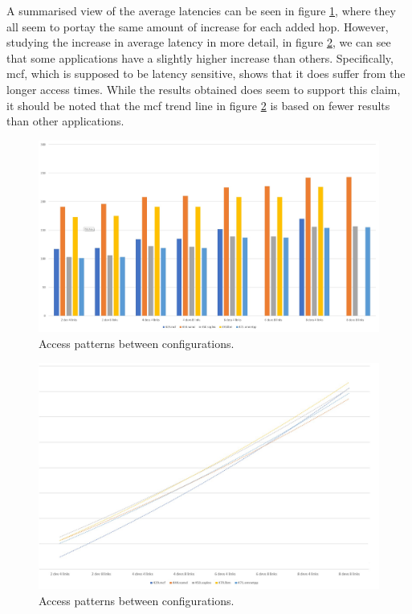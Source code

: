 A summarised view of the average latencies can be seen in figure \ref{All-apps-latency}, where they all seem to portay the same amount of increase for each added hop. However, studying the increase in average latency in more detail, in figure \ref{All-apps-latency-trends}, we can see that some applications have a slightly higher increase than others. Specifically, mcf, which is supposed to be latency sensitive, shows that it does suffer from the longer access times. While the results obtained does seem to support this claim, it should be noted that the mcf trend line in figure \ref{All-apps-latency-trends} is based on fewer results than other applications.
\bigskip

\begin{figure}[!h]
    \centering
    \includegraphics[width=0.75\linewidth]{figure/all-apps-latencies.jpg}
    \caption{Access patterns between configurations.}
    \label{All-apps-latency}
\end{figure}

\begin{figure}[!h]
    \centering
    \includegraphics[width=0.75\linewidth]{figure/all-apps-latencies-trends.jpg}
    \caption{Access patterns between configurations.}
    \label{All-apps-latency-trends}
\end{figure}

